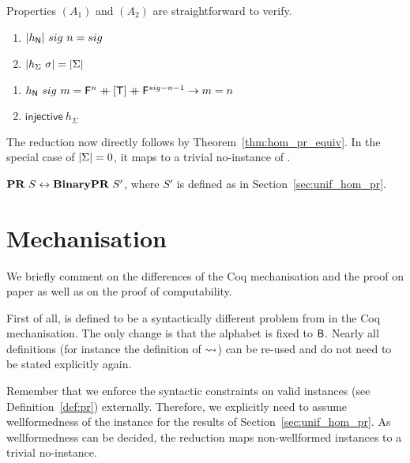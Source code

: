 Properties $(A_1)$ and $(A_2)$ are straightforward to verify.

\begin{fact}[Uniformity]\leavevmode
  \begin{enumerate}
    \item $|h_{\mathsf{N}}|~sig~n = sig$
    \item $|h_{\Sigma}~\sigma| = |\Sigma|$
  \end{enumerate}
\end{fact}

\begin{fact}[Injectivity]\leavevmode
  \begin{enumerate}
    \item $h_{\mathsf{N}}~sig~m = \mathsf{F}^n \mathbin{+\mkern-10mu+} [\mathsf{T}] \mathbin{+\mkern-10mu+} \mathsf{F}^{sig - n - 1} \rightarrow m = n$
    \item $\textsf{injective}~h_{\Sigma}$
  \end{enumerate}
\end{fact}

The reduction now directly follows by Theorem~\ref{thm:hom_pr_equiv}.
In the special case of $|\Sigma| = 0$, it maps to a trivial no-instance of \BPR{}. 

\begin{lemma}
  $\textbf{PR}{}~S \leftrightarrow \textbf{BinaryPR}{}~S'$,
  where $S'$ is defined as in Section~\ref{sec:unif_hom_pr}.
\end{lemma}

\section{Mechanisation}
We briefly comment on the differences of the Coq mechanisation and the proof on paper as well as on the proof of computability. 

First of all, \BPR{} is defined to be a syntactically different problem from \PR{} in the Coq mechanisation. The only change is that the alphabet is fixed to $\textsf{B}$. Nearly all definitions (for instance the definition of $\rightsquigarrow_{}$) can be re-used and do not need to be stated explicitly again.

Remember that we enforce the syntactic constraints on valid \PR{} instances (see Definition~\ref{def:pr}) externally. Therefore, we explicitly need to assume wellformedness of the \PR{} instance for the results of Section~\ref{sec:unif_hom_pr}. As wellformedness can be decided, the reduction maps non-wellformed instances to a trivial no-instance.

